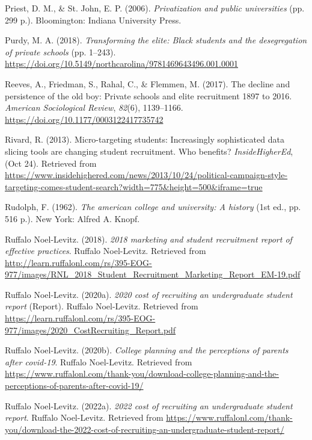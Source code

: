\documentclass[
  12pt,
]{article}
\newlength{\cslhangindent}
\newenvironment{CSLReferences}[2] %
 {\begin{list}{}{%
  \setlength{\itemindent}{0pt}
  \setlength{\leftmargin}{0pt}
  \setlength{\parsep}{0pt}
  \ifodd #1
   \setlength{\leftmargin}{\cslhangindent}
   \setlength{\itemindent}{-1\cslhangindent}
  \fi
  \setlength{\itemsep}{#2\baselineskip}}}
 {\end{list}}
\begin{document}
\begin{CSLReferences}{1}{0}
Priest, D. M., \& St. John, E. P. (2006). \emph{Privatization and public universities} (pp. 299 p.). Bloomington: Indiana University Press.

Purdy, M. A. (2018). \emph{Transforming the elite: Black students and the desegregation of private schools} (pp. 1--243). \url{https://doi.org/10.5149/northcarolina/9781469643496.001.0001}

Reeves, A., Friedman, S., Rahal, C., \& Flemmen, M. (2017). The decline and persistence of the old boy: Private schools and elite recruitment 1897 to 2016. \emph{American Sociological Review}, \emph{82}(6), 1139--1166. \url{https://doi.org/10.1177/0003122417735742}

Rivard, R. (2013). Micro-targeting students: Increasingly sophisticated data slicing tools are changing student recruitment. Who benefits? \emph{InsideHigherEd}, (Oct 24). Retrieved from \url{https://www.insidehighered.com/news/2013/10/24/political-campaign-style-targeting-comes-student-search?width=775&height=500&iframe=true}

Rudolph, F. (1962). \emph{The american college and university: A history} (1st ed., pp. 516 p.). New York: Alfred A. Knopf.

Ruffalo Noel-Levitz. (2018). \emph{2018 marketing and student recruitment report of effective practices}. Ruffalo Noel-Levitz. Retrieved from \url{http://learn.ruffalonl.com/rs/395-EOG-977/images/RNL_2018_Student_Recruitment_Marketing_Report_EM-19.pdf}

Ruffalo Noel-Levitz. (2020a). \emph{2020 cost of recruiting an undergraduate student report} (Report). Ruffalo Noel-Levitz. Retrieved from \url{https://learn.ruffalonl.com/rs/395-EOG-977/images/2020_CostRecruiting_Report.pdf}

Ruffalo Noel-Levitz. (2020b). \emph{College planning and the perceptions of parents after covid-19}. Ruffalo Noel-Levitz. Retrieved from \url{https://www.ruffalonl.com/thank-you/download-college-planning-and-the-perceptions-of-parents-after-covid-19/}

Ruffalo Noel-Levitz. (2022a). \emph{2022 cost of recruiting an undergraduate student report}. Ruffalo Noel-Levitz. Retrieved from \url{https://www.ruffalonl.com/thank-you/download-the-2022-cost-of-recruiting-an-undergraduate-student-report/}


\end{CSLReferences}
\end{document}
